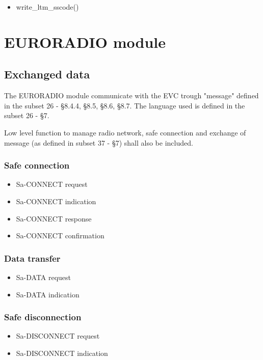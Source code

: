 \documentclass{template/openetcs_article}
\begin{document}
			\begin{itemize}
				\item write\_ltm\_sscode()
			\end{itemize}
			
\section{EURORADIO module}
	\subsection{Exchanged data}
		The EURORADIO module communicate with the EVC trough "message" defined in the subset 26 - §8.4.4, §8.5, §8.6, §8.7. The language used is defined in the subset 26 - §7.
		
		Low level function to manage radio network, safe connection and exchange of message (as defined in subset 37 - §7) shall also be included.
		
		\subsubsection{Safe connection}
			\begin{itemize}
				\item Sa-CONNECT request
				\item Sa-CONNECT indication
				\item Sa-CONNECT response
				\item Sa-CONNECT confirmation
			\end{itemize}
		
		\subsubsection{Data transfer}
			\begin{itemize}
				\item Sa-DATA request
				\item Sa-DATA indication
			\end{itemize}
		
		\subsubsection{Safe disconnection}
			\begin{itemize}
				\item Sa-DISCONNECT request
				\item Sa-DISCONNECT indication
			\end{itemize}
		
\end{document}
